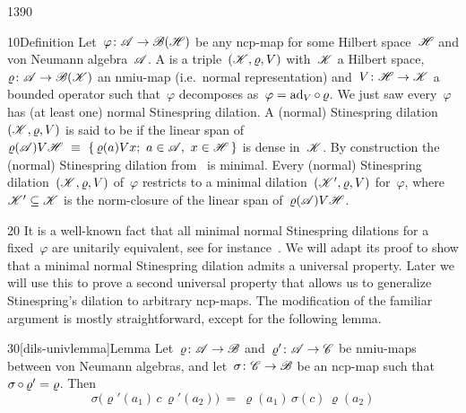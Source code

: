 \begin{parsec}{1390}%
\begin{point}{10}{Definition}%
Let~$\varphi\colon \mathscr{A} \to \mathscr{B}(\mathscr{H})$
    be any ncp-map
    for some Hilbert space~$\mathscr{H}$ and von Neumann algebra~$\mathscr{A}$.
    A 
    is a triple~$(\mathscr{K},\varrho, V)$
    with~$\mathscr{K}$ a Hilbert space,
    $\varrho\colon \mathscr{A} \to \mathscr{B}(\mathscr{K})$ an nmiu-map
        (i.e.~normal representation)
        and~$V\colon \mathscr{H} \to \mathscr{K}$ a bounded operator
        such that~$\varphi$ decomposes as~$\varphi = \mathrm{ad}_V \mathop{\circ} \varrho$.
    We just saw every~$\varphi$ has (at least one)
        normal Stinespring dilation.
    A (normal) Stinespring dilation
$(\mathscr{K},\varrho,V)$ is said to be 
    if the linear span of~$\varrho(\mathscr{A})V\mathscr{H}
        \ \equiv \ \{ \,\varrho(a) Vx; \ a \in \mathscr{A},\ x\in \mathscr{H}\,\}$
is dense in~$\mathscr{K}$.
By construction the (normal) Stinespring dilation
    from~ is minimal.
Every (normal) Stinespring dilation~$(\mathscr{K}, \varrho, V)$
    of~$\varphi$
    restricts to a minimal dilation~$(\mathscr{K}', \varrho,V)$
    for~$\varphi$, where~$\mathscr{K}' \subseteq \mathscr{K}$
    is the norm-closure of the linear span of~$\varrho(\mathscr{A})V\mathscr{H}$.
\end{point}
\begin{point}{20}%
It is a well-known fact that all minimal normal Stinespring dilations
    for a fixed~$\varphi$ are unitarily equivalent,
    see for instance~\cite[Proposition 4.2]{paulsen}.
We will adapt its proof to show that a minimal normal Stinespring
    dilation admits a universal property.
Later we will use this to prove a second universal property 
    that allows us to generalize Stinespring's dilation to
    arbitrary ncp-maps.
The modification of the familiar argument
    is mostly straightforward, except for the following lemma.
\end{point}
\begin{point}{30}[dils-univlemma]{Lemma}%
Let~$\varrho\colon \mathscr{A} \to \mathscr{B}$ and~$\varrho'\colon \mathscr{A} \to \mathscr{C}$
    be nmiu-maps between von Neumann algebras,
        and let~$\sigma \colon \mathscr{C} \to \mathscr{B}$ be an ncp-map
        such that~$\sigma \mathop{\circ} \varrho' = \varrho$. Then
\begin{equation*}
\sigma\bigl(\varrho'(a_1)\,c\, \varrho'(a_2)\bigr) \ =\   \varrho(a_1) \,\sigma(c) \,\varrho(a_2)

\end{equation*}
\end{point}
\end{parsec}
